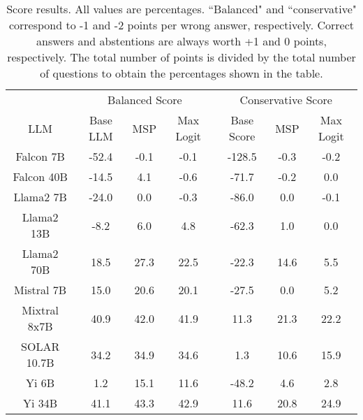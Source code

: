 \renewcommand\arraystretch{1.2}
\begin{table*}
\centering
\begin{tabular}{c|c|c|c|c|c|c}
& \multicolumn{3}{c|}{Balanced Score} & \multicolumn{3}{c}{Conservative Score} \\ 
LLM & Base LLM & MSP & Max Logit & Base Score & MSP & Max Logit\\ \hline
Falcon 7B & -52.4 & -0.1 & -0.1 & -128.5 & -0.3 & -0.2\\
Falcon 40B & -14.5 & 4.1 & -0.6 & -71.7 & -0.2 & 0.0\\
Llama2 7B & -24.0 & 0.0 & -0.3 & -86.0 & 0.0 & -0.1\\
Llama2 13B & -8.2 & 6.0 & 4.8 & -62.3 & 1.0 & 0.0\\
Llama2 70B & 18.5 & 27.3 & 22.5 & -22.3 & 14.6 & 5.5\\
Mistral 7B & 15.0 & 20.6 & 20.1 & -27.5 & 0.0 & 5.2\\
Mixtral 8x7B & 40.9 & 42.0 & 41.9 & 11.3 & 21.3 & 22.2\\
SOLAR 10.7B & 34.2 & 34.9 & 34.6 & 1.3 & 10.6 & 15.9\\
Yi 6B & 1.2 & 15.1 & 11.6 & -48.2 & 4.6 & 2.8\\
Yi 34B & 41.1 & 43.3 & 42.9 & 11.6 & 20.8 & 24.9\\
\hline
\end{tabular}
\caption{Score results. All values are percentages. ``Balanced" and ``conservative" correspond to -1 and -2 points per wrong answer, respectively. Correct answers and abstentions are always worth +1 and 0 points, respectively. The total number of points is divided by the total number of questions to obtain the percentages shown in the table.}
\label{tab:score}
\end{table*}
